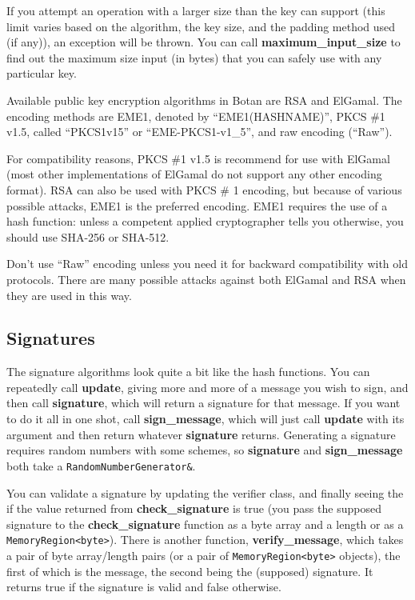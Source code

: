 \documentclass{article}
\newcommand{\function}[1]{\textbf{#1}}
\newcommand{\type}[1]{\texttt{#1}}
\begin{document}
If you attempt an operation with a larger size than the key can
support (this limit varies based on the algorithm, the key size, and
the padding method used (if any)), an exception will be thrown. You
can call \function{maximum\_input\_size} to find out the maximum size
input (in bytes) that you can safely use with any particular key.

Available public key encryption algorithms in Botan are RSA and
ElGamal. The encoding methods are EME1, denoted by ``EME1(HASHNAME)'',
PKCS \#1 v1.5, called ``PKCS1v15'' or ``EME-PKCS1-v1\_5'', and raw
encoding (``Raw'').

For compatibility reasons, PKCS \#1 v1.5 is recommend for use with
ElGamal (most other implementations of ElGamal do not support any
other encoding format). RSA can also be used with PKCS \# 1 encoding,
but because of various possible attacks, EME1 is the preferred
encoding. EME1 requires the use of a hash function: unless a competent
applied cryptographer tells you otherwise, you should use SHA-256 or
SHA-512.

Don't use ``Raw'' encoding unless you need it for backward
compatibility with old protocols. There are many possible attacks
against both ElGamal and RSA when they are used in this way.

\subsection{Signatures}

The signature algorithms look quite a bit like the hash functions. You
can repeatedly call \function{update}, giving more and more of a
message you wish to sign, and then call \function{signature}, which
will return a signature for that message. If you want to do it all in
one shot, call \function{sign\_message}, which will just call
\function{update} with its argument and then return whatever
\function{signature} returns. Generating a signature requires random
numbers with some schemes, so \function{signature} and
\function{sign\_message} both take a \type{RandomNumberGenerator\&}.

You can validate a signature by updating the verifier class, and finally seeing
the if the value returned from \function{check\_signature} is true (you pass
the supposed signature to the \function{check\_signature} function as a byte
array and a length or as a \type{MemoryRegion<byte>}). There is another
function, \function{verify\_message}, which takes a pair of byte array/length
pairs (or a pair of \type{MemoryRegion<byte>} objects), the first of which is
the message, the second being the (supposed) signature. It returns true if the
signature is valid and false otherwise.
\end{document}
